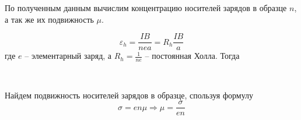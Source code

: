 


    \noindent По полученным данным вычислим концентрацию носителей зарядов в образце $n$, а так же их подвижность $\mu$.

    \begin{equation*}
        \varepsilon_h = \frac{I B}{n e a} = R_h \frac{I B}{a}
    \end{equation*}
    где $e$ -- элементарный заряд, а $R_h = \frac{1}{n e}$ -- постоянная Холла. Тогда

    \begin{center}
         \\
    \end{center}

    Найдем подвижность носителей зарядов в образце, спользуя формулу
    \begin{equation*}
        \sigma = e n \mu \Rightarrow \mu = \frac{\sigma}{e n}
    \end{equation*}
